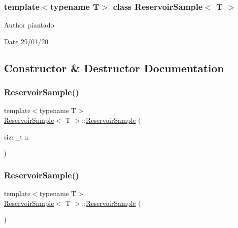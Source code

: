 \subsubsection*{template$<$typename T$>$\newline
class Reservoir\+Sample$<$ T $>$}

\begin{DoxyAuthor}{Author}
piantado 
\end{DoxyAuthor}
\begin{DoxyDate}{Date}
29/01/20 
\end{DoxyDate}


\subsection{Constructor \& Destructor Documentation}
\mbox{\label{class_reservoir_sample_a0fb545c8e65ad4978a6a67f615aa5a63}} 
\subsubsection{\texorpdfstring{Reservoir\+Sample()}{ReservoirSample()}\hspace{0.1cm}{\footnotesize\ttfamily [1/2]}}
{\footnotesize\ttfamily template$<$typename T$>$ \\
\hyperlink{class_reservoir_sample}{Reservoir\+Sample}$<$ T $>$\+::\hyperlink{class_reservoir_sample}{Reservoir\+Sample} (\begin{DoxyParamCaption}\item[{size\+\_\+t}]{n }\end{DoxyParamCaption})\hspace{0.3cm}{\ttfamily [inline]}}

\mbox{\label{class_reservoir_sample_a625597ecfb271c57a288475b4601f7c4}} 
\subsubsection{\texorpdfstring{Reservoir\+Sample()}{ReservoirSample()}\hspace{0.1cm}{\footnotesize\ttfamily [2/2]}}
{\footnotesize\ttfamily template$<$typename T$>$ \\
\hyperlink{class_reservoir_sample}{Reservoir\+Sample}$<$ T $>$\+::\hyperlink{class_reservoir_sample}{Reservoir\+Sample} (\begin{DoxyParamCaption}{ }\end{DoxyParamCaption})\hspace{0.3cm}{\ttfamily [inline]}}



